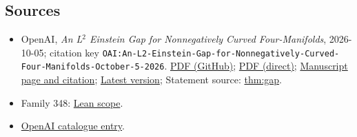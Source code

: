 \documentclass[11pt]{article}
\begin{document}
\subsection{Sources}
\begin{itemize}
\item OpenAI, \emph{An L\({}^{2}\) Einstein Gap for Nonnegatively Curved Four-Manifolds}, 2026-10-05; citation key \texttt{OAI:An-L2-Einstein-Gap-for-Nonnegatively-Curved-Four-Manifolds-October-5-2026}. \href{https://github.com/openai/math/blob/adc7f1241b42e322a6451854ab7e4b4c146bf78a/preprints/An-L2-Einstein-Gap-for-Nonnegatively-Curved-Four-Manifolds-October-5-2026/einstein-gap.pdf}{PDF (GitHub)}; \href{https://github.com/openai/math/raw/adc7f1241b42e322a6451854ab7e4b4c146bf78a/preprints/An-L2-Einstein-Gap-for-Nonnegatively-Curved-Four-Manifolds-October-5-2026/einstein-gap.pdf}{PDF (direct)}; \href{https://github.com/openai/math/blob/adc7f1241b42e322a6451854ab7e4b4c146bf78a/preprints/An-L2-Einstein-Gap-for-Nonnegatively-Curved-Four-Manifolds-October-5-2026/README.md}{Manuscript page and citation}; \href{https://github.com/openai/math/blob/main/preprints/An-L2-Einstein-Gap-for-Nonnegatively-Curved-Four-Manifolds-October-5-2026/einstein-gap.pdf}{Latest version}; Statement source: \href{https://github.com/openai/math/blob/adc7f1241b42e322a6451854ab7e4b4c146bf78a/preprints/An-L2-Einstein-Gap-for-Nonnegatively-Curved-Four-Manifolds-October-5-2026/build/source/main.tex\#L88}{thm:gap}.
\item Family 348: \href{https://github.com/openai/math/blob/adc7f1241b42e322a6451854ab7e4b4c146bf78a/lean/docs/348.md}{Lean scope}.
\item \href{https://github.com/openai/math/blob/adc7f1241b42e322a6451854ab7e4b4c146bf78a/CONTENTS.md}{OpenAI catalogue entry}.
\end{itemize}
\end{document}
